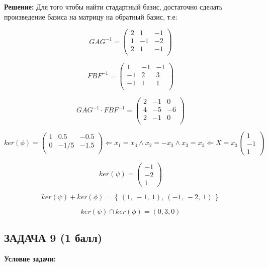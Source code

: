 \documentclass[a4paper,12pt]{article}
\begin{document}
\textbf{Решение:}
Для того чтобы найти стадартный базис, достаточно сделать произведение базиса на матрицу на обратный базис, т.е:

\[
GAG^{-1} = \begin{pmatrix}
    2 & 1 & -1 \\
    1 & -1 & -2 \\
    2 & 1 & -1 \\
\end{pmatrix}
\]

\[
FBF^{-1} = \begin{pmatrix}
    1 & -1 & -1 \\
    -1 & 2 & 3 \\
    -1 & 1 & 1 \\
\end{pmatrix}
\]

\[
GAG^{-1} \cdot FBF^{-1} = \begin{pmatrix}
    2 & -1& 0 \\
    4 & -5& -6 \\
    2 & -1& 0 \\
\end{pmatrix}
\]

\[
ker(\phi) = \begin{pmatrix}
    1 & 0.5 & -0.5 \\
    0 & -1/5 & -1.5 \\
\end{pmatrix} \Leftarrow x_1 = x_3 \land x_2 = -x_3 \land x_3 = x_3 \Leftarrow X = x_3 \begin{pmatrix}
    1 \\ -1 \\ 1
\end{pmatrix}
\]

\[
ker(\psi) = \begin{pmatrix}
    -1 \\ -2 \\ 1
\end{pmatrix}
\]

\[
ker(\psi) + ker(\phi) = \left\{\, (1,\ -1,\ 1),\ (-1,\ -2,\ 1) \,\right\}
\]

\[
ker(\psi) \cap ker(\phi) = (0, 3, 0)
\]


\vspace{1cm}

\subsection{ЗАДАЧА 9 \hfill \textbf{(1 балл)}}
\textbf{Условие задачи:}
\end{document}
